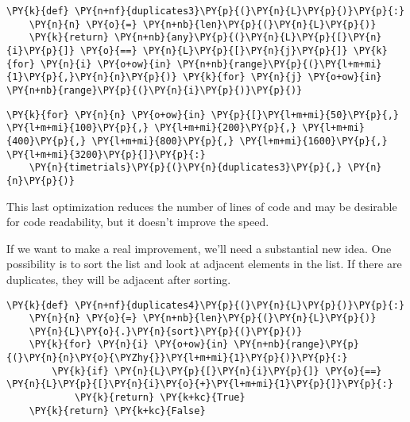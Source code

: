 \begin{Verbatim}[commandchars=\\\{\}]
\PY{k}{def} \PY{n+nf}{duplicates3}\PY{p}{(}\PY{n}{L}\PY{p}{)}\PY{p}{:}
    \PY{n}{n} \PY{o}{=} \PY{n+nb}{len}\PY{p}{(}\PY{n}{L}\PY{p}{)}
    \PY{k}{return} \PY{n+nb}{any}\PY{p}{(}\PY{n}{L}\PY{p}{[}\PY{n}{i}\PY{p}{]} \PY{o}{==} \PY{n}{L}\PY{p}{[}\PY{n}{j}\PY{p}{]} \PY{k}{for} \PY{n}{i} \PY{o+ow}{in} \PY{n+nb}{range}\PY{p}{(}\PY{l+m+mi}{1}\PY{p}{,}\PY{n}{n}\PY{p}{)} \PY{k}{for} \PY{n}{j} \PY{o+ow}{in} \PY{n+nb}{range}\PY{p}{(}\PY{n}{i}\PY{p}{)}\PY{p}{)}
\end{Verbatim}


\begin{Verbatim}[commandchars=\\\{\}]
\PY{k}{for} \PY{n}{n} \PY{o+ow}{in} \PY{p}{[}\PY{l+m+mi}{50}\PY{p}{,} \PY{l+m+mi}{100}\PY{p}{,} \PY{l+m+mi}{200}\PY{p}{,} \PY{l+m+mi}{400}\PY{p}{,} \PY{l+m+mi}{800}\PY{p}{,} \PY{l+m+mi}{1600}\PY{p}{,} \PY{l+m+mi}{3200}\PY{p}{]}\PY{p}{:}
    \PY{n}{timetrials}\PY{p}{(}\PY{n}{duplicates3}\PY{p}{,} \PY{n}{n}\PY{p}{)}
\end{Verbatim}



This last optimization reduces the number of lines of code and may be desirable for code readability, but it doesn't improve the speed.


If we want to make a real improvement, we'll need a substantial new idea.
One possibility is to sort the list and look at adjacent elements in the list.
If there are duplicates, they will be adjacent after sorting.

\begin{Verbatim}[commandchars=\\\{\}]
\PY{k}{def} \PY{n+nf}{duplicates4}\PY{p}{(}\PY{n}{L}\PY{p}{)}\PY{p}{:}
    \PY{n}{n} \PY{o}{=} \PY{n+nb}{len}\PY{p}{(}\PY{n}{L}\PY{p}{)}
    \PY{n}{L}\PY{o}{.}\PY{n}{sort}\PY{p}{(}\PY{p}{)}
    \PY{k}{for} \PY{n}{i} \PY{o+ow}{in} \PY{n+nb}{range}\PY{p}{(}\PY{n}{n}\PY{o}{\PYZhy{}}\PY{l+m+mi}{1}\PY{p}{)}\PY{p}{:}
        \PY{k}{if} \PY{n}{L}\PY{p}{[}\PY{n}{i}\PY{p}{]} \PY{o}{==} \PY{n}{L}\PY{p}{[}\PY{n}{i}\PY{o}{+}\PY{l+m+mi}{1}\PY{p}{]}\PY{p}{:}
            \PY{k}{return} \PY{k+kc}{True}
    \PY{k}{return} \PY{k+kc}{False}
\end{Verbatim}


